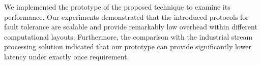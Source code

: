 We implemented the prototype of the proposed technique to examine its performance. Our experiments demonstrated that the introduced protocols for fault tolerance are scalable and provide remarkably low overhead within different computational layouts. Furthermore, the comparison with the industrial stream processing solution indicated that our prototype can provide significantly lower latency under exactly once requirement.

